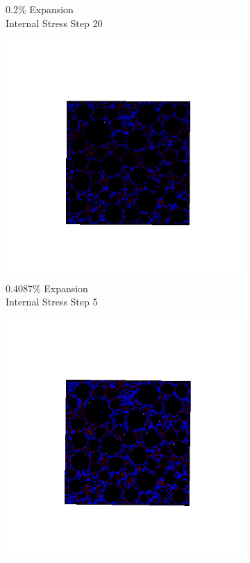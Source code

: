 \begin{figure}[ht!]
\begin{subfigure}{.25\textwidth}
      \caption{0.2\% Expansion\\Internal Stress Step 20}
    \end{subfigure}
    \begin{subfigure}{.25\textwidth}
      \centering
      \includegraphics[width=1.0\linewidth]{Files/exp_3D/DEF/A30X-1C_2_s5.png}
      \caption{0.4087\% Expansion\\Internal Stress Step 5}
    \end{subfigure}%
    \begin{subfigure}{.25\textwidth}
      \centering
      \includegraphics[width=1.0\linewidth]{Files/exp_3D/DEF/A30X-1C_2_s10.png}

\end{subfigure}
\end{figure}
